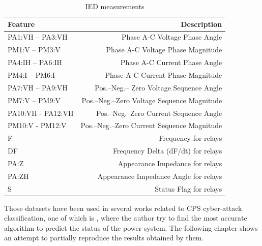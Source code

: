 \begin{table}[H]
    \centering
    \caption[IED measurements]{IED measurements \cite{adhikari_power_2014}} \label{tab:pmu_mes}
    \begin{tabular}{lr}
        \toprule
        Feature&Description \\
        \midrule
        PA1:VH – PA3:VH&Phase A-C Voltage Phase Angle \\
        PM1:V – PM3:V&Phase A-C Voltage Phase Magnitude \\
        PA4:IH – PA6:IH&Phase A-C Current Phase Angle \\
        PM4:I – PM6:I&Phase A-C Current Phase Magnitude \\
        PA7:VH – PA9:VH&Pos.–Neg.– Zero Voltage Sequence Angle \\
        PM7:V – PM9:V&Pos.–Neg.–Zero Voltage Sequence Magnitude \\
        PA10:VH - PA12:VH&Pos.–Neg.–Zero Current Sequence Angle \\
        PM10:V - PM12:V&Pos.–Neg.–Zero Current Sequence Magnitude \\
        F&Frequency for relays \\
        DF&Frequency Delta (dF/dt) for relays \\
        PA:Z&Appearance Impedance for relays \\
        PA:ZH&Appearance Impedance Angle for relays \\
        S&Status Flag for relays \\
        \bottomrule
    \end{tabular}
\end{table} 

Those datasets have been used in several works related to CPS cyber-attack classification, one of which is \cite{borges_hink_machine_2014-1}, where the author try to find the most accurate algorithm to predict the status of the power system. The following chapter shows an attempt to partially reproduce the results obtained by them.




